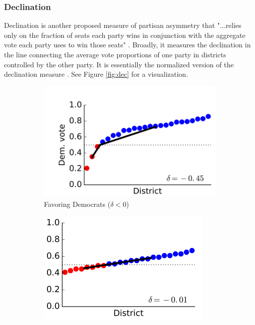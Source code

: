 \subsubsection{Declination}
\label{sec:declination}

Declination is another proposed measure of partisan asymmetry that "...relies only on the fraction of seats each party wins in conjunction with the aggregate vote each party uses to win those seats" \parencite[3]{warrington2018}. Broadly, it measures the declination in the line connecting the average vote proportions of one party in districts controlled by the other party. It is essentially the normalized version of the declination measure \parencite{katz2020}. See Figure \ref{fig:dec} for a visualization. 

\begin{figure}
    \centering
    \begin{subfigure}[b]{0.3\textwidth}
        \centering
        \includegraphics[width=\textwidth]{img/dec.dem.PNG}
        \caption{Favoring Democrats ($\delta < 0$)}
        \label{fig:dec.dem}
    \end{subfigure}
    \hfill
    \begin{subfigure}[b]{0.3\textwidth}
        \centering
        \includegraphics[width=\textwidth]{img/dec.flat.PNG}

\end{subfigure}
\end{figure}

